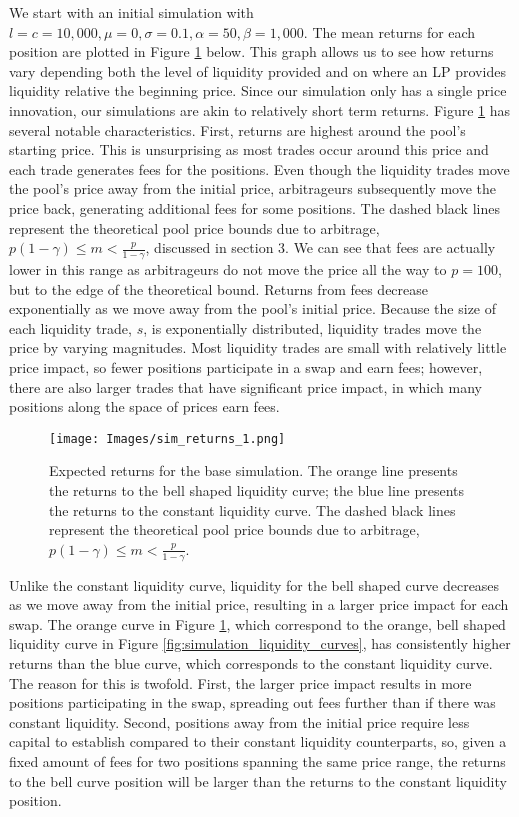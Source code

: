 \documentclass[11pt]{article}
\begin{document}
We start with an initial simulation with $l = c = 10,000, \mu = 0, \sigma = 0.1, \alpha = 50, \beta = 1,000$. The mean returns for each position are plotted in Figure \ref{fig:sim_returns_1} below. This graph allows us to see how returns vary depending both the level of liquidity provided and on where an LP provides liquidity relative the beginning price. Since our simulation only has a single price innovation, our simulations are akin to relatively short term returns. Figure \ref{fig:sim_returns_1} has several notable characteristics. First, returns are highest around the pool's starting price. This is unsurprising as most trades occur around this price and each trade generates fees for the positions. Even though the liquidity trades move the pool's price away from the initial price, arbitrageurs subsequently move the price back, generating additional fees for some positions. The dashed black lines represent the theoretical pool price bounds due to arbitrage, $p (1 - \gamma) \le m < \frac{p}{1 - \gamma}$, discussed in section 3. We can see that fees are actually lower in this range as arbitrageurs do not move the price all the way to $p = 100$, but to the edge of the theoretical bound. Returns from fees decrease exponentially as we move away from the pool's initial price. Because the size of each liquidity trade, $s$, is exponentially distributed, liquidity trades move the price by varying magnitudes. Most liquidity trades are small with relatively little price impact, so fewer positions participate in a swap and earn fees; however, there are also larger trades that have significant price impact, in which many positions along the space of prices earn fees.

\begin{figure}[H]
    \centering
    \texttt{[image: Images/sim\_returns\_1.png]}
    \caption{Expected returns for the base simulation. The orange line presents the returns to the bell shaped liquidity curve; the blue line presents the returns to the constant liquidity curve. The dashed black lines represent the theoretical pool price bounds due to arbitrage, $p (1 - \gamma) \le m < \frac{p}{1 - \gamma}$.}
    \label{fig:sim_returns_1}
\end{figure}

Unlike the constant liquidity curve, liquidity for the bell shaped curve decreases as we move away from the initial price, resulting in a larger price impact for each swap. The orange curve in Figure \ref{fig:sim_returns_1}, which correspond to the orange, bell shaped liquidity curve in Figure \ref{fig:simulation_liquidity_curves}, has consistently higher returns than the blue curve, which corresponds to the constant liquidity curve. The reason for this is twofold. First, the larger price impact results in more positions participating in the swap, spreading out fees further than if there was constant liquidity. Second, positions away from the initial price require less capital to establish compared to their constant liquidity counterparts, so, given a fixed amount of fees for two positions spanning the same price range, the returns to the bell curve position will be larger than the returns to the constant liquidity position.
\end{document}
